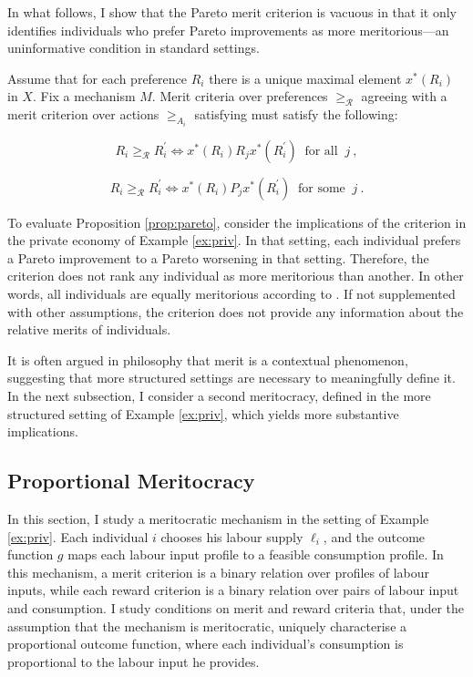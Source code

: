 In what follows, I show that the Pareto merit criterion is vacuous in that it only identifies individuals who prefer Pareto improvements as more meritorious—an uninformative condition in standard settings.

\begin{prop}\label{prop:pareto}
	Assume that for each preference \( R_i \) there is a unique maximal element \( x^{*} (R_i) \) in \( X \). Fix a mechanism \( M \). Merit criteria over preferences \( \geq_{\mathcal{R}} \) agreeing with a merit criterion over actions \( \geq_{A_i} \) satisfying  must satisfy the following:

	\[
		R_i \geq_{\mathcal{R}} R_i^{\prime} \iff x^{*} (R_i) R_j x^{*} (R^{\prime}_i)  \: \text{ for all } \: j \: ,
	\]

	\[
		R_i \geq_{\mathcal{R}} R_i^{\prime} \iff x^{*} (R_i) P_j x^{*} (R^{\prime}_i)  \: \text{ for some } \: j \: .
	\]
\end{prop}

To evaluate Proposition \ref{prop:pareto}, consider the implications of the  criterion in the private economy of Example \ref{ex:priv}. In that setting, each individual prefers a Pareto improvement to a Pareto worsening in that setting. Therefore, the  criterion does not rank any individual as more meritorious than another. In other words, all individuals are equally meritorious according to . If not supplemented with other assumptions, the  criterion does not provide any information about the relative merits of individuals.

It is often argued in philosophy that merit is a contextual phenomenon, suggesting that more structured settings are necessary to meaningfully define it. In the next subsection, I consider a second meritocracy, defined in the more structured setting of Example \ref{ex:priv}, which yields more substantive implications.

\subsection{Proportional Meritocracy}\label{subsec:prop}

In this section, I study a meritocratic mechanism in the setting of Example \ref{ex:priv}. Each individual \( i \) chooses his labour supply \( \ell_i \), and the outcome function \( g \) maps each labour input profile to a feasible consumption profile. In this mechanism, a merit criterion is a binary relation over profiles of labour inputs, while each reward criterion is a binary relation over pairs of labour input and consumption. I study conditions on merit and reward criteria that, under the assumption that the mechanism is meritocratic, uniquely characterise a proportional outcome function, where each individual's consumption is proportional to the labour input he provides.


